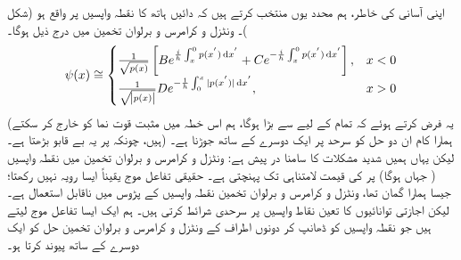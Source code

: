 اپنی آسانی کی خاطر، ہم محدد یوں منتخب کرتے ہیں کہ دائیں ہاتھ کا نقطہ واپسیں  پر واقع ہو (شکل )۔ ونٹزل و کرامرس و برلوان تخمین میں درج ذیل ہوگا۔
\begin{align}\label{مساوات_وقب_تخمین}
	\psi (x) \cong
	\begin{cases}
		\frac{1}{\sqrt{p(x)}}\left[B e^{\frac{i}{h} \int^{0}_{x} p(x^{'}) \dif x^{'}} + C e^{- \frac{i}{h} \int^{0}_{x} p(x^{'}) \dif x^{'}}\right] ,& x < 0 \\
		\frac{1}{\sqrt{\abs{p(x)}}} D e^{- \frac{1}{h} \int^{x}_{0}|p(x^{'})| \dif x^{'}},& x> 0 
	\end{cases}
\end{align}
(یہ فرض کرتے ہوئے کہ تمام  کے لیے  سے  بڑا ہوگا، ہم اس خطہ میں مثبت قوت نما کو خارج کر سکتے ہیں، چونکہ  پر یہ بے قابو بڑھتا ہے۔) ہمارا کام ان دو حل کو سرحد پر ایک دوسرے کے ساتھ جوڑنا ہے۔ لیکن یہاں ہمیں شدید مشکلات کا سامنا در پیش ہے: ونٹزل و کرامرس و برلوان تخمین میں نقطہ واپسیں ( جہاں  ہوگا) پر  کی قیمت لامتناہی تک پہنچتی ہے۔ حقیقی تفاعل موج یقیناً ایسا رویہ نہیں رکھتا؛ جیسا ہمارا گمان تھا، ونٹزل و کرامرس و برلوان تخمین نقطہ واپسیں کے  پڑوس میں ناقابل استعمال ہے۔ لیکن اجازتی توانائیوں کا تعین نقاط واپسیں پر سرحدی شرائط کرتی ہیں۔ ہم ایک ایسا  تفاعل موج لیتے ہیں جو نقطہ واپسیں کو ڈھانپ کر دونوں اطراف کے ونٹزل و کرامرس و برلوان تخمین حل کو ایک دوسرے کے ساتھ پیوند کرتا ہو۔

